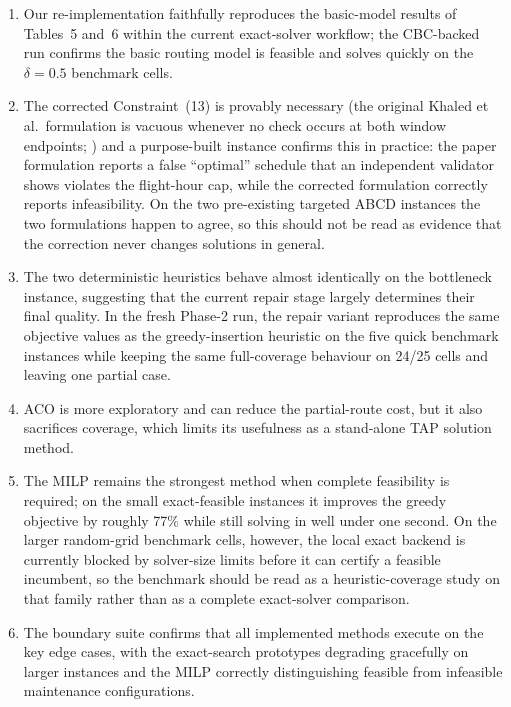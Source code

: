 \begin{enumerate}
  \item Our re-implementation faithfully reproduces the basic-model results
    of Tables~5 and~6 within the current exact-solver workflow; the CBC-backed
    run confirms the basic routing model is feasible and solves quickly on the
    $\delta=0.5$ benchmark cells.
  \item The corrected Constraint~(13) is provably necessary (the original
    Khaled et al.\ formulation is vacuous whenever no check occurs at both
    window endpoints; ) and a purpose-built instance
    confirms this in practice: the paper formulation reports a false
    ``optimal'' schedule that an independent validator shows violates the
    flight-hour cap, while the corrected formulation correctly reports
    infeasibility.  On the two pre-existing targeted ABCD instances the two
    formulations happen to agree, so this should not be read as evidence that
    the correction never changes solutions in general.
  \item The two deterministic heuristics behave almost identically on the
    bottleneck instance, suggesting that the current repair stage largely
    determines their final quality.  In the fresh Phase-2 run, the repair
    variant reproduces the same objective values as the greedy-insertion
    heuristic on the five quick benchmark instances while keeping the same
    full-coverage behaviour on 24/25 cells and leaving one partial case.
  \item ACO is more exploratory and can reduce the partial-route cost, but it
    also sacrifices coverage, which limits its usefulness as a stand-alone TAP
    solution method.
  \item The MILP remains the strongest method when complete feasibility is
    required; on the small exact-feasible instances it improves the greedy
    objective by roughly 77\% while still solving in well under one second.
    On the larger random-grid benchmark cells, however, the local exact backend
    is currently blocked by solver-size limits before it can certify a feasible
    incumbent, so the benchmark should be read as a heuristic-coverage study on
    that family rather than as a complete exact-solver comparison.
  \item The boundary suite confirms that all implemented methods execute on
    the key edge cases, with the exact-search prototypes degrading
    gracefully on larger instances and the MILP correctly distinguishing
    feasible from infeasible maintenance configurations.

\end{enumerate}
